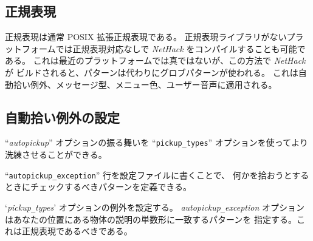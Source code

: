\subsection*{正規表現}

正規表現は通常 POSIX 拡張正規表現である。
正規表現ライブラリがないプラットフォームでは正規表現対応なしで
{\it NetHack\/} をコンパイルすることも可能である。
これは最近のプラットフォームでは真ではないが、この方法で {\it NetHack\/} が
ビルドされると、パターンは代わりにグロブパターンが使われる。
これは自動拾い例外、メッセージ型、メニュー色、ユーザー音声に適用される。

\subsection*{自動拾い例外の設定}

``{\it autopickup\/}'' オプションの振る舞いを
``{\tt pickup\verb+_+types}'' オプションを使ってより洗練させることができる。

``{\tt autopickup\verb+_+exception}''
行を設定ファイルに書くことで、
何かを拾おうとするときにチェックするべきパターンを定義できる。

\blist{}
\item[\ib{autopickup\verb+_+exception}]
`{\it pickup\verb+_+types\/}' オプションの例外を設定する。
{\it autopickup\verb+_+exception\/}
オプションはあなたの位置にある物体の説明の単数形に一致するパターンを
指定する。これは正規表現であるべきである。

